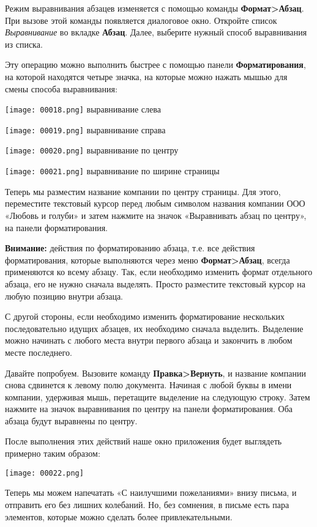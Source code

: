 ﻿\documentclass[a4paper,10pt]{article}
\begin{document}
Режим выравнивания абзацев изменяется с помощью команды \textbf{Формат>Абзац}. При вызове этой команды появляется диалоговое окно. Откройте список \textit{Выравнивание} во вкладке \textbf{Абзац}. Далее, выберите нужный способ выравнивания из списка.

Эту операцию можно выполнить быстрее с помощью панели \textbf{Форматирования}, на которой находятся четыре значка, на которые можно нажать мышью для смены способа выравнивания:

\texttt{[image: 00018.png]} выравнивание слева

\texttt{[image: 00019.png]} выравнивание справа

\texttt{[image: 00020.png]} выравнивание по центру

\texttt{[image: 00021.png]} выравнивание по ширине страницы

Теперь мы разместим название компании по центру страницы. Для этого, переместите текстовый курсор перед любым символом названия компании ООО «Любовь и голуби» и затем нажмите на значок «Выравнивать абзац по центру», на панели форматирования.

\begin{mdframed}[backgroundcolor=blue!10]
\textbf{Внимание:} действия по форматированию абзаца, т.е. все действия форматирования, которые выполняются через меню \textbf{Формат>Абзац}, всегда применяются ко всему абзацу. Так, если необходимо изменить формат отдельного абзаца, его не нужно сначала выделять. Просто разместите текстовый курсор на любую позицию внутри абзаца.
\end{mdframed}

С другой стороны, если необходимо изменить форматирование нескольких последовательно идущих абзацев, их необходимо сначала выделить. Выделение можно начинать с любого места внутри первого абзаца и закончить в любом месте последнего.

Давайте попробуем. Вызовите команду \textbf{Правка>Вернуть}, и название компании снова сдвинется к левому полю документа. Начиная с любой буквы в имени компании, удерживая мышь, перетащите выделение на следующую строку. Затем нажмите на значок выравнивания по центру на панели форматирования. Оба абзаца будут выравнены по центру.

После выполнения этих действий наше окно приложения будет выглядеть примерно таким образом:

\texttt{[image: 00022.png]}

Теперь мы можем напечатать «С наилучшими пожеланиями» внизу письма, и отправить его без лишних колебаний. Но, без сомнения, в письме есть пара элементов, которые можно сделать более привлекательными.
\end{document}
